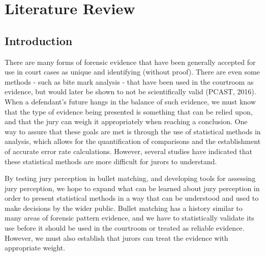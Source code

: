 \documentclass[print]{nuthesis}
\begin{document}

\tableofcontents

\listoffigures
\listoftables

\mainmatter
\raggedright

\hypertarget{litreview}{%
\chapter{Literature Review}\label{litreview}}

\hypertarget{introduction}{%
\section{Introduction}\label{introduction}}

There are many forms of forensic evidence that have been generally accepted for use in court cases as unique and identifying (without proof).
There are even some methods - such as bite mark analysis - that have been used in the courtroom as evidence, but would later be shown to not be scientifically valid (PCAST, 2016).
When a defendant's future hangs in the balance of such evidence, we must know that the type of evidence being presented is something that can be relied upon, and that the jury can weigh it appropriately when reaching a conclusion.
One way to assure that these goals are met is through the use of statistical methods in analysis, which allows for the quantification of comparisons and the establishment of accurate error rate calculations.
However, several studies have indicated that these statistical methods are more difficult for jurors to understand.

By testing jury perception in bullet matching, and developing tools for assessing jury perception, we hope to expand what can be learned about jury perception in order to present statistical methods in a way that can be understood and used to make decisions by the wider public.
Bullet matching has a history similar to many areas of forensic pattern evidence, and we have to statistically validate its use before it should be used in the courtroom or treated as reliable evidence.
However, we must also establish that jurors can treat the evidence with appropriate weight.
\end{document}
